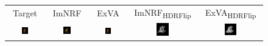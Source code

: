 
\begingroup
\begin{figure}[!htb]
    \centering
    \setlength\tabcolsep{0pt}
    \begin{tabular*}{\textwidth}{ c c c c c }
        Target & ImNRF & ExVA & ImNRF\textsubscript{HDRFlip} & ExVA\textsubscript{HDRFlip} \\
        
          \includegraphics[width=0.2\textwidth]{figures/results/arb_set/validation/lego6_targ_256px.png}
        & \includegraphics[width=0.2\textwidth]{figures/results/arb_set/validation/lego6_imnrf_150k.png}
        & \includegraphics[width=0.2\textwidth]{figures/results/arb_set/validation/lego6_exva_150k.png}
        & \includegraphics[width=0.2\textwidth]{figures/results/arb_set/validation/lego6_imnrf_hdrflip_150k.png}
        & \includegraphics[width=0.2\textwidth]{figures/results/arb_set/validation/lego6_exva_hdrflip_150k.png} \\[-6pt]
        

\end{tabular*}
\end{figure}
